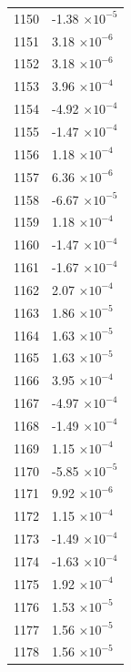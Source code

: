 \documentclass[a4paper,11pt]{article}
\begin{document}
\begin{center}
\begin{longtable}{|R{1.5cm}|R{2.5cm}|}
 1150 &        -1.38 $\times 10^{          -5}$ \\
 1151 &         3.18 $\times 10^{          -6}$ \\
 1152 &         3.18 $\times 10^{          -6}$ \\
 1153 &         3.96 $\times 10^{          -4}$ \\
 1154 &        -4.92 $\times 10^{          -4}$ \\
 1155 &        -1.47 $\times 10^{          -4}$ \\
 1156 &         1.18 $\times 10^{          -4}$ \\
 1157 &         6.36 $\times 10^{          -6}$ \\
 1158 &        -6.67 $\times 10^{          -5}$ \\
 1159 &         1.18 $\times 10^{          -4}$ \\
 1160 &        -1.47 $\times 10^{          -4}$ \\
 1161 &        -1.67 $\times 10^{          -4}$ \\
 1162 &         2.07 $\times 10^{          -4}$ \\
 1163 &         1.86 $\times 10^{          -5}$ \\
 1164 &         1.63 $\times 10^{          -5}$ \\
 1165 &         1.63 $\times 10^{          -5}$ \\
 1166 &         3.95 $\times 10^{          -4}$ \\
 1167 &        -4.97 $\times 10^{          -4}$ \\
 1168 &        -1.49 $\times 10^{          -4}$ \\
 1169 &         1.15 $\times 10^{          -4}$ \\
 1170 &        -5.85 $\times 10^{          -5}$ \\
 1171 &         9.92 $\times 10^{          -6}$ \\
 1172 &         1.15 $\times 10^{          -4}$ \\
 1173 &        -1.49 $\times 10^{          -4}$ \\
 1174 &        -1.63 $\times 10^{          -4}$ \\
 1175 &         1.92 $\times 10^{          -4}$ \\
 1176 &         1.53 $\times 10^{          -5}$ \\
 1177 &         1.56 $\times 10^{          -5}$ \\
 1178 &         1.56 $\times 10^{          -5}$ \\

\end{longtable}
\end{center}
\end{document}
